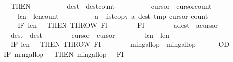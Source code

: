 \begin{isabellebody}
\ \ \ \ \ \ \ \ THEN\isanewline
\ \ \ \ \ \ \ \ \ \ {\isasymacute}dest\ {\isacharcolon}{\isacharequal}{\isacharequal}\ {\isasymacute}dest{\isacharminus}{\isasymacute}count{}{\isacharsemicolon}{\isacharsemicolon}\isanewline
\ \ \ \ \ \ \ \ \ \ {\isasymacute}cursor{}\ {\isacharcolon}{\isacharequal}{\isacharequal}\ {\isasymacute}cursor{}{\isacharminus}{\isasymacute}count{}{\isacharsemicolon}{\isacharsemicolon}\isanewline
\ \ \ \ \ \ \ \ \ \ {\isasymacute}len{}\ {\isacharcolon}{\isacharequal}{\isacharequal}\ {\isasymacute}len{}{\isacharminus}{\isasymacute}count{}{\isacharsemicolon}{\isacharsemicolon}\isanewline
\ \ \ \ \ \ \ \ \ \ {\isasymacute}a\ {\isacharcolon}{\isacharequal}{\isacharequal}\ list{\isacharunderscore}copy\ {\isasymacute}a\ {\isacharparenleft}{\isasymacute}dest{\isacharplus}{}{\isacharparenright}\ {\isasymacute}tmp\ {\isacharparenleft}{\isasymacute}cursor{}{\isacharplus}{}{\isacharparenright}\ {\isasymacute}count{}{\isacharsemicolon}{\isacharsemicolon}\isanewline
\ \ \ \ \ \ \ \ \ \ IF\ {\isasymacute}len{}\ {\isasymle}\ {}\ THEN\ THROW\ FI\isanewline
\ \ \ \ \ \ \ \ FI{\isacharsemicolon}{\isacharsemicolon}\isanewline
\ \ \ \ \ \ \ \ {\isasymacute}a{\isacharbang}{\isasymacute}dest\ {\isacharcolon}{\isacharequal}{\isacharequal}\ {\isasymacute}a{\isacharbang}{\isasymacute}cursor{}{\isacharsemicolon}{\isacharsemicolon}\isanewline
\ \ \ \ \ \ \ \ {\isasymacute}dest\ {\isacharcolon}{\isacharequal}{\isacharequal}\ {\isasymacute}dest{\isacharminus}{}{\isacharsemicolon}{\isacharsemicolon}\isanewline
\ \ \ \ \ \ \ \ {\isasymacute}cursor{}\ {\isacharcolon}{\isacharequal}{\isacharequal}\ {\isasymacute}cursor{}{\isacharminus}{}{\isacharsemicolon}{\isacharsemicolon}\isanewline
\ \ \ \ \ \ \ \ {\isasymacute}len{}\ {\isacharcolon}{\isacharequal}{\isacharequal}\ {\isasymacute}len{}{\isacharminus}{}{\isacharsemicolon}{\isacharsemicolon}\isanewline
\ \ \ \ \ \ \ \ IF\ {\isasymacute}len{}\ {\isacharequal}\ {}\ THEN\ THROW\ FI{\isacharsemicolon}{\isacharsemicolon}\isanewline
\ \ \ \ \ \ \ \ {\isasymacute}min{\isacharunderscore}gallop\ {\isacharcolon}{\isacharequal}{\isacharequal}\ {\isasymacute}min{\isacharunderscore}gallop{\isacharminus}{}\isanewline
\ \ \ \ \ \ OD{\isacharsemicolon}{\isacharsemicolon}\isanewline
\ \ \ \ \ \ IF\ {\isasymacute}min{\isacharunderscore}gallop\ {\isacharless}\ {}\ THEN\ {\isasymacute}min{\isacharunderscore}gallop\ {\isacharcolon}{\isacharequal}{\isacharequal}\ {}\ FI{\isacharsemicolon}{\isacharsemicolon}\isanewline

\end{isabellebody}
